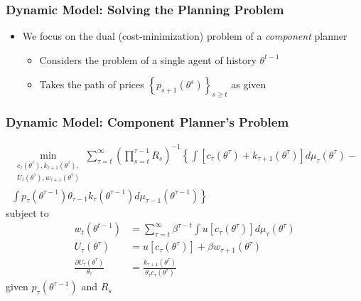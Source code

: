 \documentclass{beamer}
\begin{document}
\begin{frame}
    \frametitle{Dynamic Model: Solving the Planning Problem}

    \begin{itemize}
        \item We focus on the dual (cost-minimization) problem of a \textit{component} planner 
        \begin{itemize}
            \item Considers the problem of a single agent of history \( \theta^{t-1} \)
            \item Takes the path of prices \( \left\{ p_{s+1}\left( \theta^s \right) \right\}_{s\ge t} \) as given 
        \end{itemize}
    \end{itemize}

\end{frame}

\begin{frame}
    \frametitle{Dynamic Model: Component Planner's Problem}
    
    \begin{multline*}
        \min_{\substack{c_{\tau}\left(\theta^{\tau}\right),k_{\tau+1}\left(\theta^{\tau}\right),\\
        U_{\tau}\left(\theta^{\tau}\right),w_{\tau+1}\left(\theta^{\tau}\right)
        }
        }\sum_{\tau=t}^{\infty}\left(\prod_{s=t}^{\tau-1}R_{s}\right)^{-1} \left\{ \int\left[c_{\tau}\left(\theta^{\tau}\right)+k_{\tau+1}\left(\theta^{\tau}\right)\right]d\mu_{\tau}\left(\theta^{\tau}\right)- \right.
        \\ \left. \int p_{\tau}\left(\theta^{\tau-1}\right)\theta_{\tau-1}k_{\tau}\left(\theta^{\tau-1}\right)d\mu_{\tau-1}\left(\theta^{\tau-1}\right) \right\}
    \end{multline*}
    subject to 
    \begin{align*}
        w_{t}\left(\theta^{t-1}\right) & =\sum_{\tau=t}^{\infty}\beta^{\tau-t}\int u\left[c_{\tau}\left(\theta^{\tau}\right)\right]d\mu_{\tau}\left(\theta^{\tau}\right)\\
        U_{\tau}\left(\theta^{\tau}\right) & =u\left[c_{\tau}\left(\theta^{\tau}\right)\right]+\beta w_{\tau+1}\left(\theta^{\tau}\right)\\
        \frac{\partial U_{\tau}\left(\theta^{\tau}\right)}{\theta_{\tau}} & =\frac{k_{\tau+1}\left(\theta^{\tau}\right)}{\theta_{\tau}c_{\tau}\left(\theta^{\tau}\right)}
    \end{align*}
    given \( p_{\tau}\left(\theta^{\tau-1}\right) \) and \( R_s \)
    
\end{frame}
\end{document}
